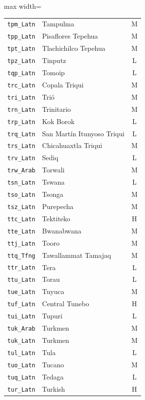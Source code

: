 {\begin{adjustbox}{max width=\textwidth}
\begin{tabular}{llc}
        \texttt{tpm\_Latn} & Tampulma & M \\
        \texttt{tpp\_Latn} & Pisaflores Tepehua & M \\
        \texttt{tpt\_Latn} & Tlachichilco Tepehua & M \\
        \texttt{tpz\_Latn} & Tinputz & L \\
        \texttt{tqp\_Latn} & Tomoip & L \\
        \texttt{trc\_Latn} & Copala Triqui & M \\
        \texttt{tri\_Latn} & Trió & M \\
        \texttt{trn\_Latn} & Trinitario & M \\
        \texttt{trp\_Latn} & Kok Borok & L \\
        \texttt{trq\_Latn} & San Martín Itunyoso Triqui & L \\
        \texttt{trs\_Latn} & Chicahuaxtla Triqui & M \\
        \texttt{trv\_Latn} & Sediq & L \\
        \texttt{trw\_Arab} & Torwali & M \\
        \texttt{tsn\_Latn} & Tswana & L \\
        \texttt{tso\_Latn} & Tsonga & M \\
        \texttt{tsz\_Latn} & Purepecha & M \\
        \texttt{ttc\_Latn} & Tektiteko & H \\
        \texttt{tte\_Latn} & Bwanabwana & M \\
        \texttt{ttj\_Latn} & Tooro & M \\
        \texttt{ttq\_Tfng} & Tawallammat Tamajaq & M \\
        \texttt{ttr\_Latn} & Tera & L \\
        \texttt{ttu\_Latn} & Torau & L \\
        \texttt{tue\_Latn} & Tuyuca & M \\
        \texttt{tuf\_Latn} & Central Tunebo & H \\
        \texttt{tui\_Latn} & Tupuri & L \\
        \texttt{tuk\_Arab} & Turkmen & M \\
        \texttt{tuk\_Latn} & Turkmen & M \\
        \texttt{tul\_Latn} & Tula & L \\
        \texttt{tuo\_Latn} & Tucano & M \\
        \texttt{tuq\_Latn} & Tedaga & L \\
        \texttt{tur\_Latn} & Turkish & H \\

\end{tabular}
\end{adjustbox}}
